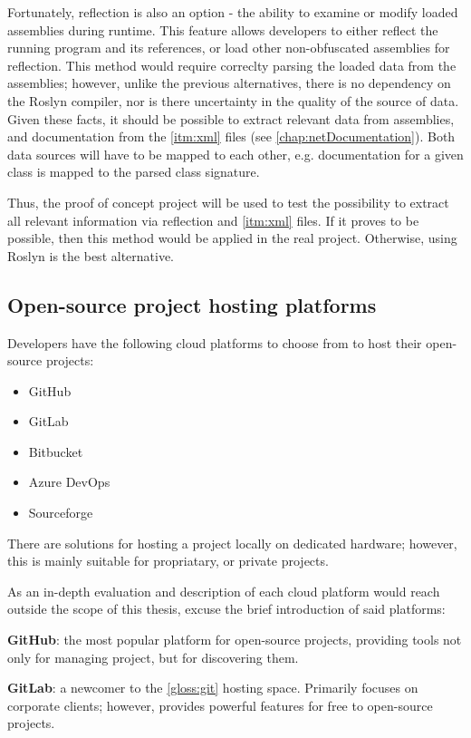 Fortunately, reflection is also an option - the ability to examine or modify loaded assemblies during runtime. This feature allows developers to either reflect the running program and its references, or load other non-obfuscated assemblies for reflection. This method would require correclty parsing the loaded data from the assemblies; however, unlike the previous alternatives, there is no dependency on the Roslyn compiler, nor is there uncertainty in the quality of the source of data. Given these facts, it should be possible to extract relevant data from assemblies, and documentation from the \ref{itm:xml} files (see \ref{chap:netDocumentation}). Both data sources will have to be mapped to each other, e.g. documentation for a given class is mapped to the parsed class signature.

Thus, the proof of concept project will be used to test the possibility to extract all relevant information via reflection and \ref{itm:xml} files. If it proves to be possible, then this method would be applied in the real project. Otherwise, using Roslyn is the best alternative.

\subsection{Open-source project hosting platforms}
Developers have the following cloud platforms to choose from to host their open-source projects:
\begin{itemize}
    \item GitHub
    \item GitLab
    \item Bitbucket
    \item Azure DevOps
    \item Sourceforge
\end{itemize}

There are solutions for hosting a project locally on dedicated hardware; however, this is mainly suitable for propriatary, or private projects.

As an in-depth evaluation and description of each cloud platform would reach outside the scope of this thesis, excuse the brief introduction of said platforms:

\textbf{GitHub}: the most popular platform for open-source projects, providing tools not only for managing project, but for discovering them.

\textbf{GitLab}: a newcomer to the \ref{gloss:git} hosting space. Primarily focuses on corporate clients; however, provides powerful features for free to open-source projects.

